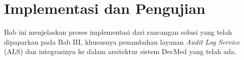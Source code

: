 \chapter{Implementasi dan Pengujian}

Bab ini menjelaskan proses implementasi dari rancangan solusi yang telah
dipaparkan pada Bab III, khususnya penambahan layanan \textit{Audit Log
Service} (ALS) dan integrasinya ke dalam arsitektur sistem DecMed yang
telah ada.







